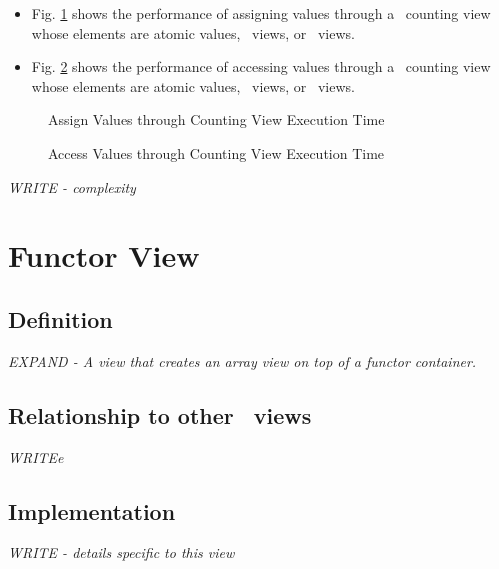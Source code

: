 \begin{itemize}
\item
Fig. \ref{fig:cnt-vw-assign-exper}
shows the performance of assigning values through a \stapl\ counting view
whose elements are atomic values, \stl\ views, or \stapl\ views.
\item
Fig. \ref{fig:cnt-vw-access-exper}
shows the performance of accessing values through a \stapl\ counting view
whose elements are atomic values, \stl\ views, or \stapl\ views.
\end{itemize}

\begin{figure}[p]
\caption{Assign Values through Counting View Execution Time}
\label{fig:cnt-vw-assign-exper}
\end{figure}

\begin{figure}[p]
\caption{Access Values through Counting View Execution Time}
\label{fig:cnt-vw-access-exper}
\end{figure}

\emph{WRITE - complexity}


\section{Functor View} \label{sec-func-vw}

\subsection{Definition}

\textit{EXPAND - A view that creates an array view on top of a functor container.}

\subsection{Relationship to other \stapl\ views}

\textit{WRITEe}

\subsection{Implementation}

\textit{WRITE - details specific to this view}

